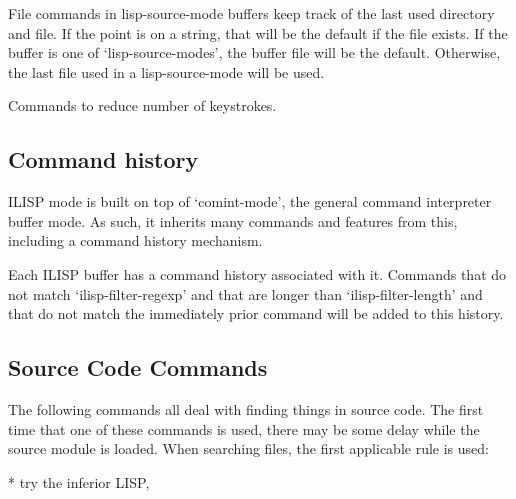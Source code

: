 


File commands in lisp-source-mode buffers keep track of the last used
directory and file. If the point is on a string, that will be the
default if the file exists. If the buffer is one of
`lisp-source-modes', the buffer file will be the default. Otherwise,
the last file used in a lisp-source-mode will be used.




Commands to reduce number of keystrokes.



\subsection{Command history}

ILISP mode is built on top of `comint-mode', the general command
interpreter buffer mode. As such, it inherits many
commands and features from this, including a command history mechanism.

Each ILISP buffer has a command history associated with it. Commands
that do not match `ilisp-filter-regexp' and that are longer than
`ilisp-filter-length' and that do not match the immediately prior
command will be added to this history.



\subsection{Source Code Commands}

   The following commands all deal with finding things in source code.
The first time that one of these commands is used, there may be some
delay while the source module is loaded.  When searching files, the
first applicable rule is used:

   * try the inferior LISP,

